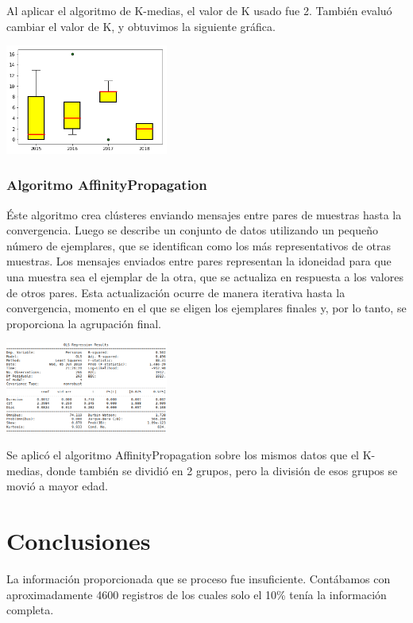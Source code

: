 \documentclass[5p,times]{elsarticle}
\begin{document}
Al aplicar el algoritmo de K-medias, el valor de K usado fue 2. También evaluó cambiar el valor de K, y obtuvimos la siguiente gráfica.

\includegraphics[width=0.4\textwidth]{06}


\subsubsection*{Algoritmo AffinityPropagation}

Éste algoritmo crea clústeres enviando mensajes entre pares de muestras hasta la convergencia. Luego se describe un conjunto de datos utilizando un pequeño número de ejemplares, que se identifican como los más representativos de otras muestras. Los mensajes enviados entre pares representan la idoneidad para que una muestra sea el ejemplar de la otra, que se actualiza en respuesta a los valores de otros pares. Esta actualización ocurre de manera iterativa hasta la convergencia, momento en el que se eligen los ejemplares finales y, por lo tanto, se proporciona la agrupación final.


\includegraphics[width=0.4\textwidth]{07}

Se aplicó el algoritmo AffinityPropagation sobre los mismos datos que el K-medias, donde también se dividió en 2 grupos, pero la división de esos grupos se movió a mayor edad.





\section*{Conclusiones}
La información proporcionada que se proceso fue insuficiente. Contábamos con aproximadamente 4600 registros de los cuales solo el 10\% tenía la información completa. 
\end{document}
